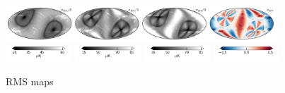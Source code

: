\documentclass[twocolumn]{../../common/aa}
\begin{document}
\begin{figure}[p]
	\includegraphics[width=0.9\textwidth]{figures/090-WMAP_W4_rms.pdf}
	\includegraphics[width=0.22\textwidth]{figures/cbar_rms_I.pdf}
	\includegraphics[width=0.22\textwidth]{figures/cbar_rms_P.pdf}
	\includegraphics[width=0.22\textwidth]{figures/cbar_rms_P.pdf}
	\includegraphics[width=0.22\textwidth]{figures/cbar_rho.pdf}
	\caption{RMS maps}
        \label{fig:rms}
\end{figure}
\end{document}
